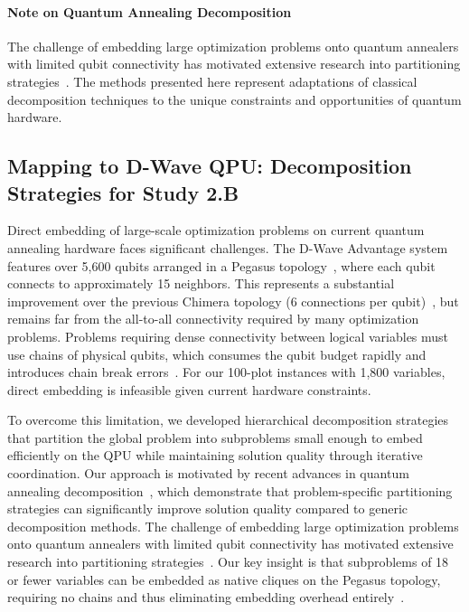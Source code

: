 \documentclass{oqireport}
\begin{document}
\paragraph{Note on Quantum Annealing Decomposition}
The challenge of embedding large optimization problems onto quantum annealers with limited qubit connectivity has motivated extensive research into partitioning strategies~\cite{booth2017partitioning, bian2020solving, date2019efficiently}. The methods presented here represent adaptations of classical decomposition techniques to the unique constraints and opportunities of quantum hardware.




\subsection{Mapping to D-Wave QPU: Decomposition Strategies for Study 2.B}

Direct embedding of large-scale optimization problems on current quantum annealing hardware faces significant challenges. The D-Wave Advantage system features over 5,600 qubits arranged in a Pegasus topology~\cite{dwave2020advantage, dwave2022pegasus}, where each qubit connects to approximately 15 neighbors. This represents a substantial improvement over the previous Chimera topology (6 connections per qubit)~\cite{boothler2022benchmarking}, but remains far from the all-to-all connectivity required by many optimization problems. Problems requiring dense connectivity between logical variables must use chains of physical qubits, which consumes the qubit budget rapidly and introduces chain break errors~\cite{date2019efficiently}. For our 100-plot instances with 1,800 variables, direct embedding is infeasible given current hardware constraints.

To overcome this limitation, we developed hierarchical decomposition strategies that partition the global problem into subproblems small enough to embed efficiently on the QPU while maintaining solution quality through iterative coordination. Our approach is motivated by recent advances in quantum annealing decomposition~\cite{booth2017partitioning, bass2021optimizing}, which demonstrate that problem-specific partitioning strategies can significantly improve solution quality compared to generic decomposition methods. The challenge of embedding large optimization problems onto quantum annealers with limited qubit connectivity has motivated extensive research into partitioning strategies~\cite{bian2020solving, yarkoni2022quantum, okada2020breaking}. Our key insight is that subproblems of 18 or fewer variables can be embedded as native cliques on the Pegasus topology, requiring no chains and thus eliminating embedding overhead entirely~\cite{dwave2022pegasus}.
\end{document}

